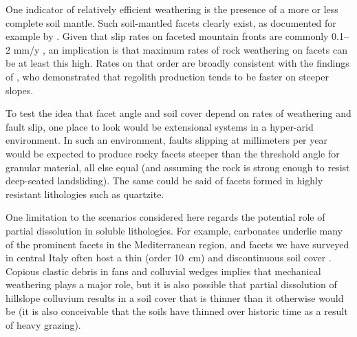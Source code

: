 
One indicator of relatively efficient weathering is the presence of a more or less complete soil mantle. Such soil-mantled facets clearly exist, as documented for example by \citet{menges1990soils}. Given that slip rates on faceted mountain fronts are commonly 0.1--2 mm/y \citep{depolo2000estimating}, an implication is that maximum rates of rock weathering on facets can be at least this high. Rates on that order are broadly consistent with the findings of \citet{heimsath2012soil}, who demonstrated  that regolith production tends to be faster on steeper slopes.


To test the idea that facet angle and soil cover depend on rates of weathering and fault slip, one place to look would be extensional systems in a hyper-arid environment. In such an environment, faults slipping at millimeters per year would be expected to produce rocky facets steeper than the threshold angle for granular material, all else equal (and assuming the rock is strong enough to resist deep-seated landsliding). The same could be said of facets formed in highly resistant lithologies such as quartzite.

One limitation to the scenarios considered here regards the potential role of partial dissolution in soluble lithologies. For example, carbonates underlie many of the prominent facets in the Mediterranean region, and facets we have surveyed in central Italy often host a thin (order 10~cm) and discontinuous soil cover \citep{tucker2011geomorphic}. Copious clastic debris in fans and colluvial wedges implies that mechanical weathering plays a major role, but it is also possible that partial dissolution of hillslope colluvium results in a soil cover that is thinner than it otherwise would be (it is also conceivable that the soils have thinned over historic time as a result of heavy grazing).


